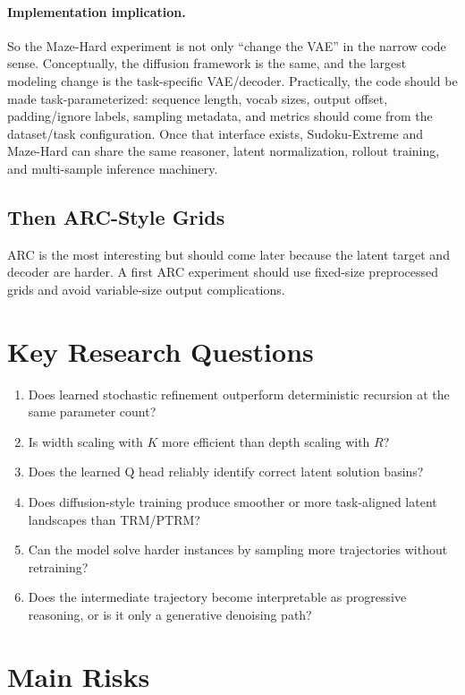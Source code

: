\documentclass[11pt]{article}
\begin{document}
\paragraph{Implementation implication.}
So the Maze-Hard experiment is not only ``change the VAE'' in the narrow code sense. Conceptually, the diffusion framework is the same, and the largest modeling change is the task-specific VAE/decoder. Practically, the code should be made task-parameterized: sequence length, vocab sizes, output offset, padding/ignore labels, sampling metadata, and metrics should come from the dataset/task configuration. Once that interface exists, Sudoku-Extreme and Maze-Hard can share the same reasoner, latent normalization, rollout training, and multi-sample inference machinery.

\subsection{Then ARC-Style Grids}

ARC is the most interesting but should come later because the latent target and decoder are harder. A first ARC experiment should use fixed-size preprocessed grids and avoid variable-size output complications.

\section{Key Research Questions}

\begin{enumerate}[itemsep=0pt]
    \item Does learned stochastic refinement outperform deterministic recursion at the same parameter count?
    \item Is width scaling with \(K\) more efficient than depth scaling with \(R\)?
    \item Does the learned Q head reliably identify correct latent solution basins?
    \item Does diffusion-style training produce smoother or more task-aligned latent landscapes than TRM/PTRM?
    \item Can the model solve harder instances by sampling more trajectories without retraining?
    \item Does the intermediate trajectory become interpretable as progressive reasoning, or is it only a generative denoising path?
\end{enumerate}

\section{Main Risks}
\end{document}
